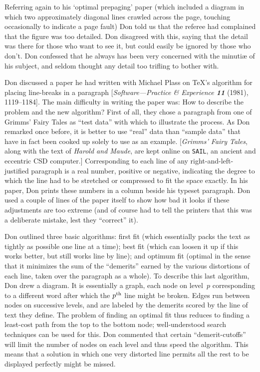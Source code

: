 Referring again to his `optimal prepaging' paper (which included a diagram in
which two approximately diagonal lines crawled across the page,
touching occasionally to indicate a page fault) Don told us that the
referee had complained that the figure was too detailed. Don disagreed
with this, saying that the detail was there for those who want to see
it, but could easily be ignored by those who don't. Don confessed that
he always has been very concerned with the minuti{\ae} of his subject, and
seldom thought any detail too trifling to bother with.

Don discussed a paper he had written with Michael Plass on \TeX's
algorithm for placing line-breaks in a paragraph [{\sl Software---Practice
\& Experience\/ \bf11} (1981), 1119--1184].
The main difficulty in writing the paper was: 
How to describe the problem and the new
algorithm? First of all, they chose a paragraph from one of Grimms'
Fairy Tales as ``test data'' with which to illustrate the process. As Don
remarked once before, it is better to use ``real'' data than ``sample
data'' that have in fact been cooked up solely to use as an example.
[{\sl Grimms' Fairy Tales}, along with the text of {\sl Harold and Maude}, are
kept online on {\tt SAIL}, an ancient and eccentric CSD computer.]
Corresponding to each line of any right-and-left-justified paragraph
is a real number, positive or negative, indicating the degree to which
the line had to be stretched or compressed to fit the space exactly.
In his paper, Don prints these numbers in a column beside his typeset
paragraph. Don used a couple of lines of the paper itself to show how
bad it looks if these adjustments are too extreme (and of course had
to tell the printers that this was a deliberate mistake, lest they
``correct'' it).

Don outlined three basic algorithms: first fit (which essentially
packs the text as tightly as possible one line at a time);
 best fit (which can loosen it
up if this works better, but still works line by line);
 and optimum fit (optimal in the sense that
it minimizes the sum of the ``demerits'' earned by the various
distortions of each line,
taken over the paragraph as a whole).
 To describe this last algorithm, Don drew a
diagram. It is essentially a graph, each node on level~$p$ corresponding
to a different word after which the $p^{\rm th}$ line might be broken. Edges
run between nodes on successive levels, and are labeled by the
demerits scored by the line of text they define. The problem of finding
an optimal fit thus reduces to finding a least-cost path from the
top to the bottom node; well-understood search techniques can be used
for this. Don commented that certain ``demerit-cutoffs'' will
limit the number of nodes on each level and thus speed the algorithm.
This means that a solution in which one very distorted line permits
all the rest to be displayed perfectly might be missed.

